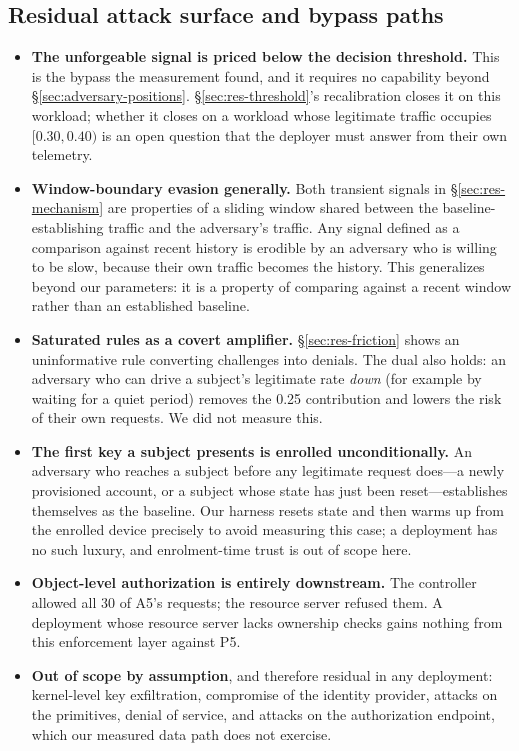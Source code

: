 \subsection{Residual attack surface and bypass paths}

\begin{itemize}
  \item \textbf{The unforgeable signal is priced below the decision threshold.} This is the bypass the measurement found, and it requires no capability beyond \S\ref{sec:adversary-positions}. \S\ref{sec:res-threshold}'s recalibration closes it on this workload; whether it closes on a workload whose legitimate traffic occupies $[0.30, 0.40)$ is an open question that the deployer must answer from their own telemetry.
  \item \textbf{Window-boundary evasion generally.} Both transient signals in \S\ref{sec:res-mechanism} are properties of a sliding window shared between the baseline-establishing traffic and the adversary's traffic. Any signal defined as a comparison against recent history is erodible by an adversary who is willing to be slow, because their own traffic becomes the history. This generalizes beyond our parameters: it is a property of comparing against a recent window rather than an established baseline.
  \item \textbf{Saturated rules as a covert amplifier.} \S\ref{sec:res-friction} shows an uninformative rule converting challenges into denials. The dual also holds: an adversary who can drive a subject's legitimate rate \textit{down} (for example by waiting for a quiet period) removes the 0.25 contribution and lowers the risk of their own requests. We did not measure this.
  \item \textbf{The first key a subject presents is enrolled unconditionally.} An adversary who reaches a subject before any legitimate request does---a newly provisioned account, or a subject whose state has just been reset---establishes themselves as the baseline. Our harness resets state and then warms up from the enrolled device precisely to avoid measuring this case; a deployment has no such luxury, and enrolment-time trust is out of scope here.
  \item \textbf{Object-level authorization is entirely downstream.} The controller allowed all 30 of A5's requests; the resource server refused them. A deployment whose resource server lacks ownership checks gains nothing from this enforcement layer against P5.
  \item \textbf{Out of scope by assumption}, and therefore residual in any deployment: kernel-level key exfiltration, compromise of the identity provider, attacks on the primitives, denial of service, and attacks on the authorization endpoint, which our measured data path does not exercise.
\end{itemize}

